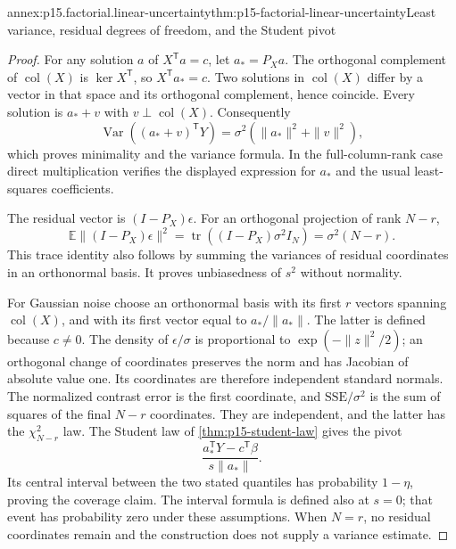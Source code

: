 \begin{annexitem}{annex:p15.factorial.linear-uncertainty}{thm:p15-factorial-linear-uncertainty}{Least variance, residual degrees of freedom, and the Student pivot}
\begin{proof}
For any solution \(a\) of \(X^{\mathsf T}a=c\), let
\(a_*=P_Xa\). The orthogonal complement of \(\operatorname{col}(X)\)
is \(\ker X^{\mathsf T}\), so \(X^{\mathsf T}a_*=c\).
Two solutions in \(\operatorname{col}(X)\) differ by a vector in that
space and its orthogonal complement, hence coincide. Every solution is
\(a_*+v\) with \(v\perp\operatorname{col}(X)\). Consequently
\[
 \operatorname{Var}((a_*+v)^{\mathsf T}Y)
 =\sigma^2(\|a_*\|^2+\|v\|^2),
\]
which proves minimality and the variance formula. In the full-column-rank
case direct multiplication verifies the displayed expression for \(a_*\)
and the usual least-squares coefficients.

The residual vector is \((I-P_X)\epsilon\). For an orthogonal projection
of rank \(N-r\),
\[
 \mathbb E\|(I-P_X)\epsilon\|^2
 =\operatorname{tr}((I-P_X)\sigma^2I_N)=\sigma^2(N-r).
\]
This trace identity also follows by summing the variances of residual
coordinates in an orthonormal basis. It proves unbiasedness of \(s^2\)
without normality.

For Gaussian noise choose an orthonormal basis with its first \(r\)
vectors spanning \(\operatorname{col}(X)\), and with its first vector
equal to \(a_*/\|a_*\|\). The latter is defined because \(c\ne0\).
The density of \(\epsilon/\sigma\) is proportional to
\(\exp(-\|z\|^2/2)\); an orthogonal change of coordinates preserves
the norm and has Jacobian of absolute value one. Its coordinates are
therefore independent standard normals. The normalized contrast error is
the first coordinate, and \(\mathrm{SSE}/\sigma^2\) is the sum of
squares of the final \(N-r\) coordinates. They are independent, and
the latter has the \(\chi^2_{N-r}\) law. The Student law of
\cref{thm:p15-student-law} gives the pivot
\[
 \frac{a_*^{\mathsf T}Y-c^{\mathsf T}\beta}{s\|a_*\|}.
\]
Its central interval between the two stated quantiles has probability
\(1-\eta\), proving the coverage claim. The interval formula is defined
also at \(s=0\); that event has probability zero under these assumptions.
When \(N=r\), no residual coordinates remain and the construction does
not supply a variance estimate.
\end{proof}
\end{annexitem}

